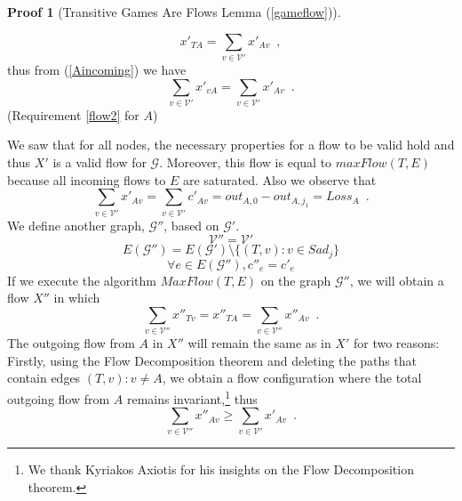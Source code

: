 \documentclass[11pt]{llncs}
\theoremstyle{definition}
\newtheorem{sepproof}{Proof}
\begin{document}
\begin{sepproof}[Transitive Games Are Flows Lemma (\ref{gameflow})]
\begin{itemize}
\begin{equation*}
             x'_{TA} = \sum\limits_{v \in \mathcal{V}'}x'_{Av} \enspace,
          \end{equation*}
          thus from (\ref{Aincoming}) we have
          \begin{equation*}
             \sum\limits_{v \in \mathcal{V}'}x'_{vA} = \sum\limits_{v \in \mathcal{V}'}x'_{Av} \enspace.
          \end{equation*}
          (Requirement \ref{flow2} for $A$)
       \end{itemize}
       We saw that for all nodes, the necessary properties for a flow to be valid hold and thus $X'$ is a valid flow for
       $\mathcal{G}$. Moreover, this flow is equal to $maxFlow(T, E)$ because all incoming flows to $E$ are saturated.
       Also we observe that
       \begin{equation}
       \label{xprimeequalloss}
          \sum\limits_{v \in \mathcal{V}'}x'_{Av} = \sum\limits_{v \in \mathcal{V}'}c'_{Av} = out_{A, 0} - out_{A, j_1} =
          Loss_A \enspace.
       \end{equation}
       We define another graph, $\mathcal{G}''$, based on $\mathcal{G}'$.
       \begin{equation*}
          \mathcal{V}'' = \mathcal{V}'
       \end{equation*}
       \begin{equation*}
          E(\mathcal{G}'') = E(\mathcal{G}') \setminus \{(T, v) : v \in Sad_j\}
       \end{equation*}
       \begin{equation*}
          \forall e \in E(\mathcal{G}''), c''_e = c'_e
       \end{equation*}
       If we execute the algorithm $MaxFlow(T, E)$ on the graph $\mathcal{G}''$, we will obtain a flow $X''$ in which
       \begin{equation*}
          \sum\limits_{v \in \mathcal{V}''}x''_{Tv} = x''_{TA} = \sum\limits_{v \in \mathcal{V}''}x''_{Av} \enspace.
       \end{equation*}
       The outgoing flow from $A$ in $X''$ will remain the same as in $X'$ for two reasons: Firstly, using the Flow
       Decomposition theorem \cite{amo} and deleting the paths that contain edges $\left(T, v\right): v \neq A$, we
       obtain a flow configuration where the total outgoing flow from $A$ remains invariant,\footnote{We thank Kyriakos Axiotis
       for his insights on the Flow Decomposition theorem.} thus
       \begin{equation*}
          \sum\limits_{v \in \mathcal{V}''}x''_{Av} \geq \sum\limits_{v \in \mathcal{V}'}x'_{Av} \enspace.

\end{equation*}
\end{sepproof}
\end{document}
